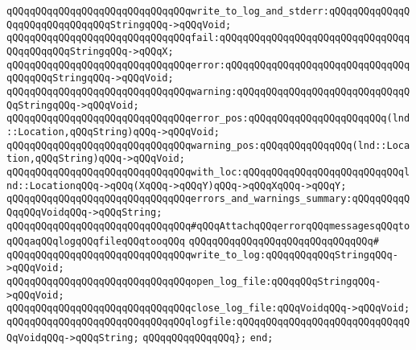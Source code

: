 \verb|qQQqqQQqqQQqqQQqqQQqqQQqqQQqqQQqwrite_to_log_and_stderr:qQQqqQQqqQQqqQQqqQQqqQQqqQQqqQQqStringqQQq->qQQqVoid;|\newline
\newline
\verb|qQQqqQQqqQQqqQQqqQQqqQQqqQQqqQQqfail:qQQqqQQqqQQqqQQqqQQqqQQqqQQqqQQqqQQqqQQqqQQqStringqQQq->qQQqX;|\newline
\verb|qQQqqQQqqQQqqQQqqQQqqQQqqQQqqQQqerror:qQQqqQQqqQQqqQQqqQQqqQQqqQQqqQQqqQQqqQQqStringqQQq->qQQqVoid;|\newline
\verb|qQQqqQQqqQQqqQQqqQQqqQQqqQQqqQQqwarning:qQQqqQQqqQQqqQQqqQQqqQQqqQQqqQQqStringqQQq->qQQqVoid;|\newline
\newline
\verb|qQQqqQQqqQQqqQQqqQQqqQQqqQQqqQQqerror_pos:qQQqqQQqqQQqqQQqqQQqqQQq(lnd::Location,qQQqString)qQQq->qQQqVoid;|\newline
\verb|qQQqqQQqqQQqqQQqqQQqqQQqqQQqqQQqwarning_pos:qQQqqQQqqQQqqQQq(lnd::Location,qQQqString)qQQq->qQQqVoid;|\newline
\newline
\verb|qQQqqQQqqQQqqQQqqQQqqQQqqQQqqQQqwith_loc:qQQqqQQqqQQqqQQqqQQqqQQqqQQqlnd::LocationqQQq->qQQq(XqQQq->qQQqY)qQQq->qQQqXqQQq->qQQqY;|\newline
\newline
\verb|qQQqqQQqqQQqqQQqqQQqqQQqqQQqqQQqerrors_and_warnings_summary:qQQqqQQqqQQqqQQqVoidqQQq->qQQqString;|\newline
\newline
\verb|qQQqqQQqqQQqqQQqqQQqqQQqqQQqqQQq#qQQqAttachqQQqerrorqQQqmessagesqQQqtoqQQqaqQQqlogqQQqfileqQQqtooqQQq|\newline
\verb|qQQqqQQqqQQqqQQqqQQqqQQqqQQqqQQq#|\newline
\verb|qQQqqQQqqQQqqQQqqQQqqQQqqQQqqQQqwrite_to_log:qQQqqQQqqQQqStringqQQq->qQQqVoid;|\newline
\verb|qQQqqQQqqQQqqQQqqQQqqQQqqQQqqQQqopen_log_file:qQQqqQQqStringqQQq->qQQqVoid;|\newline
\verb|qQQqqQQqqQQqqQQqqQQqqQQqqQQqqQQqclose_log_file:qQQqVoidqQQq->qQQqVoid;|\newline
\verb|qQQqqQQqqQQqqQQqqQQqqQQqqQQqqQQqlogfile:qQQqqQQqqQQqqQQqqQQqqQQqqQQqqQQqVoidqQQq->qQQqString;|\newline
\verb|qQQqqQQqqQQqqQQq};|\newline
\verb|end;|\newline


